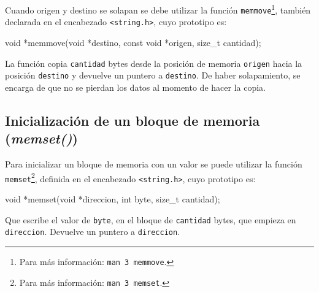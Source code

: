 Cuando origen y destino se solapan se debe utilizar la función
\lstinline!memmove!\footnote{Para más información: \texttt{man 3 memmove}.},
también declarada en el encabezado \lstinline!<string.h>!, cuyo prototipo es:

\begin{codigo-c-plano}
void *memmove(void *destino, const void *origen, size_t cantidad);
\end{codigo-c-plano}

La función copia \lstinline!cantidad! bytes desde la posición de memoria
\lstinline!origen! hacia la posición \lstinline!destino! y devuelve un puntero
a \lstinline!destino!. De haber solapamiento, se encarga de que no se pierdan
los datos al momento de hacer la copia.

\subsection{Inicialización de un bloque de memoria (\textit{memset()})}

Para inicializar un bloque de memoria con un valor se puede utilizar la
función \lstinline!memset!\footnote{Para más información: \texttt{man 3
memset}.}, definida en el encabezado \lstinline!<string.h>!, cuyo prototipo
es:

\begin{codigo-c-plano}
void *memset(void *direccion, int byte, size_t cantidad);
\end{codigo-c-plano}

Que escribe el valor de \lstinline!byte!, en el bloque de
\lstinline!cantidad! bytes, que empieza en \lstinline!direccion!.  Devuelve un
puntero a \lstinline!direccion!.

